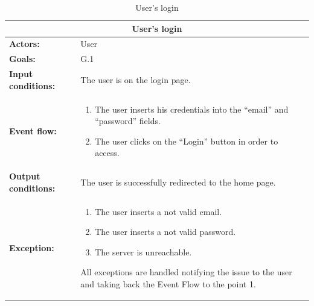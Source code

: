 \begin{table}
\begin{tabular} { p{5cm} p{8cm} } 
\multicolumn{2}{c}{\textbf{User's login}}\\
\hline
\textbf{Actors:} & User \\ 
\textbf{Goals:} & G.1 \\ 
\textbf{Input conditions:} & The user is on the login page. \\
\textbf{Event flow:} & \begin{enumerate}
				\item
				The user inserts his credentials into the “email” and “password” fields.
				\item
				The user clicks on the “Login” button in order to access.
			\end{enumerate} \\ 
\textbf{Output conditions:} & The user is successfully redirected to the
home page.\\ 
\textbf{Exception:} & \begin{enumerate}
				\item
				The user inserts a not valid email.
				\item
				The user inserts a not valid password.
				\item
				The server is unreachable.
			\end{enumerate}
All exceptions are handled notifying the issue to the user and taking back the Event Flow to the point 1. \\
\hline
\end{tabular}
\caption{User's login}
\label{ref:userslogin}
\end{table}
\clearpage

